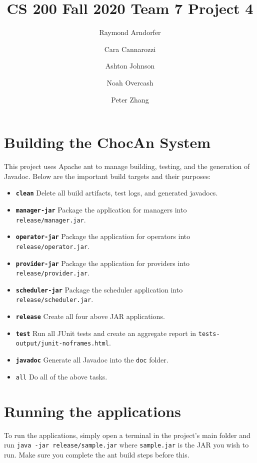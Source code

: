 \documentclass[letterpaper,11pt]{article}
\begin{document}
\title{\vspace{-1.7cm}\textbf{CS 200 Fall 2020 Team 7 Project 4}}
\author{
	Raymond Arndorfer
	\and 
	Cara Cannarozzi
	\and 
	Ashton Johnson
	\and 
	Noah Overcash	
	\and 
	Peter Zhang	
}
\date{}
\maketitle

\vspace{-.5cm}

\section*{Building the ChocAn System}

This project uses Apache ant to manage building, testing, and the generation of Javadoc.  Below are the important build targets and their purposes:

\begin{itemize}
	\item \textbf{\texttt{clean}} Delete all build artifacts, test logs, and generated javadocs.
	\item \textbf{\texttt{manager-jar}} Package the application for managers into \texttt{release/manager.jar}.
	\item \textbf{\texttt{operator-jar}} Package the application for operators into \texttt{release/operator.jar}.
	\item \textbf{\texttt{provider-jar}} Package the application for providers into \texttt{release/provider.jar}.
	\item \textbf{\texttt{scheduler-jar}} Package the scheduler application into \texttt{release/scheduler.jar}.
	\item \textbf{\texttt{release}} Create all four above JAR applications.
	\item \textbf{\texttt{test}} Run all JUnit tests and create an aggregate report in \texttt{tests-output/junit-noframes.html}.
	\item \textbf{\texttt{javadoc}} Generate all Javadoc into the \texttt{doc} folder.
	\item \texttt{all} Do all of the above tasks.
\end{itemize}

\section*{Running the applications}

To run the applications, simply open a terminal in the project's main folder and run \texttt{java -jar release/sample.jar} where \texttt{sample.jar} is the JAR you wish to run.  Make sure you complete the ant build steps before this.
\end{document}
